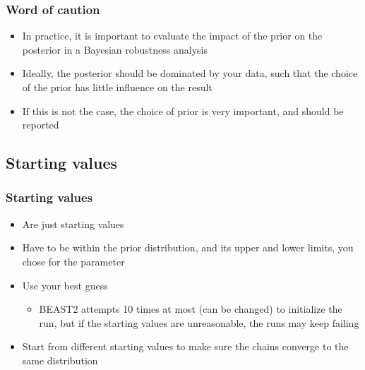 \begin{frame}\frametitle{Word of caution}
	\begin{itemize}
		\item In practice, it is important to evaluate the impact of the prior on the posterior in a Bayesian robustness analysis
		\item Ideally, the posterior should be dominated by your data, such that the choice of the prior has little influence on the result
		\item If this is not the case, the choice of prior is very important, and should be reported
	\end{itemize}
\end{frame}

\subsection{Starting values}

\begin{frame}\frametitle{Starting values}
	\begin{itemize}
		\item Are just starting values
		\item Have to be within the prior distribution, and its upper and lower limits, you chose for the parameter
		\item Use your best guess
		\begin{itemize}
			\item BEAST2 attempts 10 times at most (can be changed) to initialize the run, but if the starting values are unreasonable, the runs may keep failing
		\end{itemize}
		\item Start from different starting values to make sure the chains converge to the same distribution
	\end{itemize}	
\end{frame}
